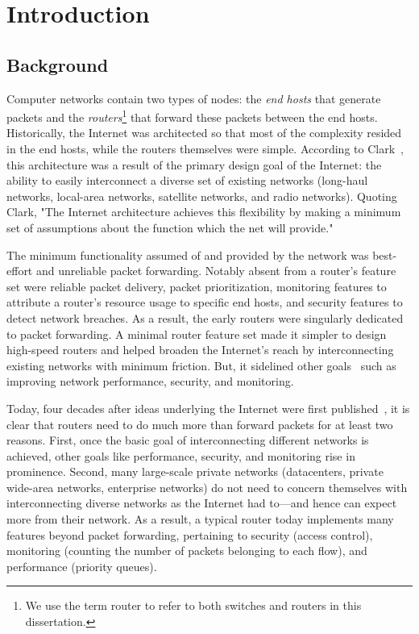 \chapter{Introduction}
\label{chap:intro}

\section{Background}
\label{s:intro_background}

Computer networks contain two types of nodes: the {\em end hosts} that generate
packets and the {\em routers}\footnote{We use the term router to refer to both
switches and routers in this dissertation.} that forward these packets between
the end hosts. Historically, the Internet was architected so that most of the
complexity resided in the end hosts, while the routers themselves were simple.
According to Clark~\cite{design_philosophy}, this architecture was a result of
the primary design goal of the Internet: the ability to easily interconnect a
diverse set of existing networks (\eg long-haul networks, local-area networks,
satellite networks, and radio networks). Quoting Clark, "The Internet
architecture achieves this flexibility by making a minimum set of assumptions
about the function which the net will provide."

The minimum functionality assumed of and provided by the network was
best-effort and unreliable packet forwarding. Notably absent from a router's
feature set were reliable packet delivery, packet prioritization, monitoring
features to attribute a router's resource usage to specific end hosts, and
security features to detect network breaches. As a result, the early routers
were singularly dedicated to packet forwarding. A minimal router feature set
made it simpler to design high-speed routers and helped broaden the Internet's
reach by interconnecting existing networks with minimum friction. But, it
sidelined other goals~\cite{design_philosophy} such as improving network
performance, security, and monitoring.
 
Today, four decades after ideas underlying the Internet were first
published~\cite{cerf74}, it is clear that routers need to do much more than
forward packets for at least two reasons. First, once the basic goal of
interconnecting different networks is achieved, other goals like performance,
security, and monitoring rise in prominence.  Second, many large-scale private
networks (\eg datacenters, private wide-area networks, enterprise networks) do
not need to concern themselves with interconnecting diverse networks as the
Internet had to---and hence can expect more from their network. As a result, a
typical router today implements many features beyond packet forwarding,
pertaining to security (\eg access control), monitoring (\eg counting the
number of packets belonging to each flow), and performance (\eg priority
queues).

